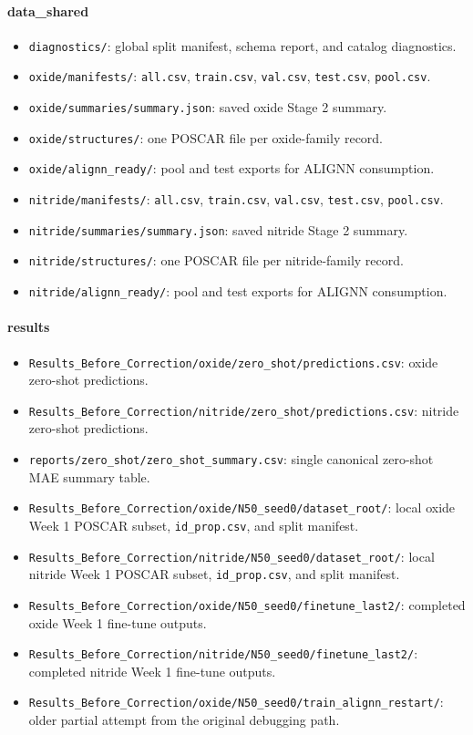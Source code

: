 \documentclass[11pt]{article}
\begin{document}
\paragraph{data\_shared}
\begin{itemize}
  \item \texttt{diagnostics/}: global split manifest, schema report, and catalog diagnostics.
  \item \texttt{oxide/manifests/}: \texttt{all.csv}, \texttt{train.csv}, \texttt{val.csv}, \texttt{test.csv}, \texttt{pool.csv}.
  \item \texttt{oxide/summaries/summary.json}: saved oxide Stage 2 summary.
  \item \texttt{oxide/structures/}: one POSCAR file per oxide-family record.
  \item \texttt{oxide/alignn\_ready/}: pool and test exports for ALIGNN consumption.
  \item \texttt{nitride/manifests/}: \texttt{all.csv}, \texttt{train.csv}, \texttt{val.csv}, \texttt{test.csv}, \texttt{pool.csv}.
  \item \texttt{nitride/summaries/summary.json}: saved nitride Stage 2 summary.
  \item \texttt{nitride/structures/}: one POSCAR file per nitride-family record.
  \item \texttt{nitride/alignn\_ready/}: pool and test exports for ALIGNN consumption.
\end{itemize}

\paragraph{results}
\begin{itemize}
  \item \texttt{Results_Before_Correction/oxide/zero\_shot/predictions.csv}: oxide zero-shot predictions.
  \item \texttt{Results_Before_Correction/nitride/zero\_shot/predictions.csv}: nitride zero-shot predictions.
  \item \texttt{reports/zero\_shot/zero\_shot\_summary.csv}: single canonical zero-shot MAE summary table.
  \item \texttt{Results_Before_Correction/oxide/N50\_seed0/dataset\_root/}: local oxide Week 1 POSCAR subset, \texttt{id\_prop.csv}, and split manifest.
  \item \texttt{Results_Before_Correction/nitride/N50\_seed0/dataset\_root/}: local nitride Week 1 POSCAR subset, \texttt{id\_prop.csv}, and split manifest.
  \item \texttt{Results_Before_Correction/oxide/N50\_seed0/finetune\_last2/}: completed oxide Week 1 fine-tune outputs.
  \item \texttt{Results_Before_Correction/nitride/N50\_seed0/finetune\_last2/}: completed nitride Week 1 fine-tune outputs.
  \item \texttt{Results_Before_Correction/oxide/N50\_seed0/train\_alignn\_restart/}: older partial attempt from the original debugging path.
\end{itemize}
\end{document}
